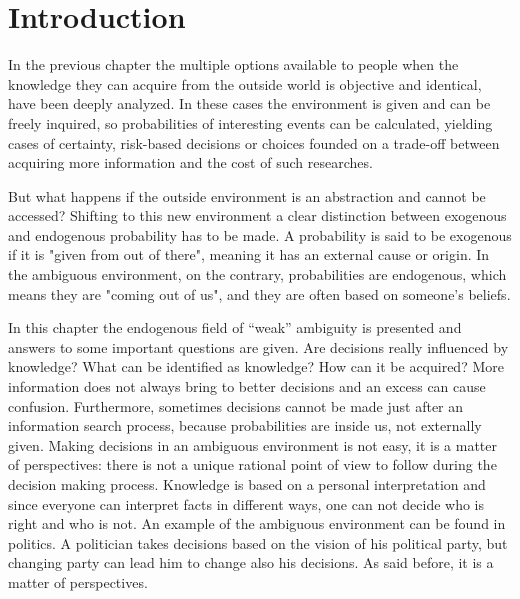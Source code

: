 \section{Introduction}
In the previous chapter the multiple options available to people when the knowledge they can acquire from the outside world is objective and identical, have been deeply analyzed. In these cases the environment is given and can be freely inquired, so probabilities of interesting events can be calculated, yielding cases of certainty, risk-based decisions or choices founded on a trade-off between acquiring more information and the cost of such researches.

But what happens if the outside environment is an abstraction and cannot be accessed? Shifting to this new environment a clear distinction between exogenous and endogenous probability has to be made. A probability is said to be exogenous if it is "given from out of there", meaning it has an external cause or origin. In the ambiguous environment, on the contrary, probabilities are endogenous, which means they are "coming out of us", and they are often based on someone’s beliefs.

In this chapter the endogenous field of “weak” ambiguity is presented and answers to some important questions are given. Are decisions really influenced by knowledge? What can be identified as knowledge? How can it be acquired? More information does not always bring to better decisions and an excess can cause confusion. Furthermore, sometimes decisions cannot be made just after an information search process, because probabilities are inside us, not externally given. Making decisions in an ambiguous environment is not easy, it is a matter of perspectives: there is not a unique rational point of view to follow during the decision making process.
Knowledge is based on a personal interpretation and since everyone can interpret facts in different ways, one can not decide who is right and who is not. An example of the ambiguous environment can be found in politics. A politician takes decisions based on the vision of his political party, but changing party can lead him to change also his decisions. As said before, it is a matter of perspectives.

